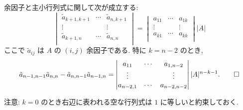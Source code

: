 \documentclass[12pt,twoside]{jarticle}
\begin{document}
\begin{question}
\label{q:Jacobi-identity-1}
  余因子と主小行列式に関して次が成立する:
  \begin{equation*}
    \begin{vmatrix}
      \tilde{a}_{k+1,k+1} & \cdots & \tilde{a}_{n,k+1} \\
      \vdots              &        & \vdots \\
      \tilde{a}_{k+1,n}   & \cdots & \tilde{a}_{n,n} \\
    \end{vmatrix}
    =
    \begin{vmatrix}
      a_{11} & \cdots & a_{1k} \\
      \vdots &        & \vdots \\
      a_{k1} & \cdots & a_{kk} \\
    \end{vmatrix}
    |A|
  \end{equation*}
  ここで $\tilde{a}_{ij}$ は $A$ の $(i,j)$ 余因子である.
  特に $k=n-2$ のとき, 
  \begin{equation*}
      \tilde{a}_{n-1,n-1} \tilde{a}_{n,n}
    - \tilde{a}_{n,n-1} \tilde{a}_{n-1,n}
    = 
    \begin{vmatrix}
      a_{11}    & \cdots & a_{1,n-2} \\
      \vdots    &        & \vdots \\
      a_{n-2,1} & \cdots & a_{n-2,n-2} \\
    \end{vmatrix}
    |A|^{n-k-1}.
  \qed
  \end{equation*}
\end{question}

\noindent
注意: $k=0$ のとき右辺に表われる空な行列式は $1$ に等しいと約束しておく. 
\end{document}
